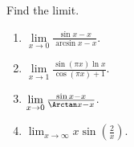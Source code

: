 Find the limit.
\begin{multicols}{2}
\begin{enumerate}[ref={\fcProblemRef}]
\item $\displaystyle \lim\limits_{x\to 0} \frac{\sin x-x }{\arcsin x-x } $.
\item \label{problemLHospital (sin (pi x) ln x )/ (cos pi x +1)}  $\displaystyle \lim\limits_{x\to 1} \frac{\sin \left(\pi x\right)\ln x }{\cos(\pi x)+1 } $.
\item \label{problemlim x to 0 (sin x - x)/(arctan x - x)} $\lim\limits_{x\to 0}\frac{\sin x- x}{\Arctan x -x}$.
\item \label{problemlimxtoinftysin(2/x)}
$ {\displaystyle \lim_{x \to \infty} x \sin\left(\frac{2}{x}\right)}.$

\end{enumerate}
\end{multicols}
